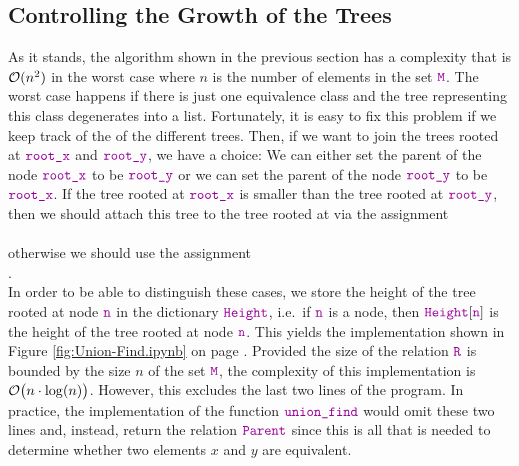 \subsection{Controlling the Growth of the Trees}
As it stands, the algorithm shown in the previous section has a complexity that is $\mathcal{O}(n^2)$ in the
worst case where $n$ is the number of elements in the set $ \mytt{M}$.  The worst case happens if there
is just one equivalence class and the tree representing this class degenerates into a list.
Fortunately, it is easy to fix this problem if we keep track of the  of the
different trees.  Then, if we want to join the trees rooted at $\mytt{root\_x}$ and
$\mytt{root\_y}$, we have a choice: We can either set the parent of the node $\mytt{root\_x}$ to
be $\mytt{root\_y}$ or we can set the parent of the node $\mytt{root\_y}$ to be $\mytt{root\_x}$.
If the tree rooted at $\mytt{root\_x}$ is smaller than the tree rooted at $\mytt{root\_y}$, then we should
attach this tree to the tree rooted at  via the assignment
\\[0.2cm]
\hspace*{1.3cm}
\\[0.2cm]
otherwise we should use the assignment
\\[0.2cm]
\hspace*{1.3cm}
.
\\[0.2cm]
In order to be able to distinguish these cases, we store the height of the tree rooted at node
$\mytt{n}$ in the dictionary $\mytt{Height}$, i.e.~if $\mytt{n}$ is a node, then $\mytt{Height}[\mytt{n}]$ is
the height of the tree rooted at node $\mytt{n}$.  This yields the implementation shown in Figure
\ref{fig:Union-Find.ipynb} on page \pageref{fig:Union-Find.ipynb}.  Provided the size  of the relation
$\mytt{R}$ is bounded by the size $n$ of the set $ \mytt{M}$, the complexity of this
implementation is $\mathcal{O}\bigl(n \cdot \log(n)\bigr)$.  However, this excludes the last two lines of
the program.  In practice, the implementation of the function $\mytt{union\_find}$ would omit these
two lines and, instead, return the relation $\mytt{Parent}$ since this is all that is needed to
determine whether two elements $x$ and $y$ are equivalent. 

